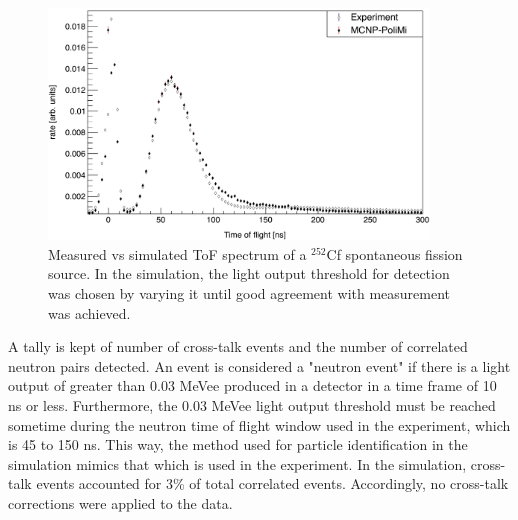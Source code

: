 \begin{figure}
    \centering
    \includegraphics[width = 0.9\textwidth]{Content/Methods/Cf252MCNPVsEXP.png}
    \caption{Measured vs simulated ToF spectrum of a $^{252}$Cf spontaneous fission source.
    In the simulation, the light output threshold for detection was chosen by varying it until good agreement with measurement was achieved.}
    \label{fig:Cf252MCNPVsEXP}
\end{figure}
A tally is kept of number of cross-talk events and the number of correlated neutron pairs detected.
An event is considered a "neutron event" if there is a light output of greater than 0.03 MeVee produced in a detector in a time frame of 10 ns or less.
Furthermore, the 0.03 MeVee light output threshold must be reached sometime during the neutron time of flight window used in the experiment, which is 45 to 150 ns.
This way, the method used for particle identification in the simulation mimics that which is used in the experiment.
In the simulation, cross-talk events accounted for 3\% of total correlated events.
Accordingly, no cross-talk corrections were applied to the data.

